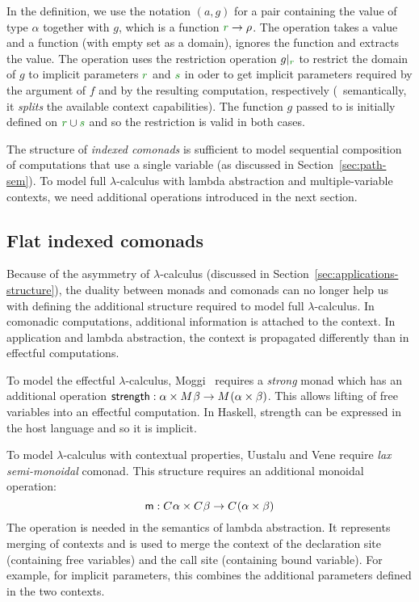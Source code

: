 \noindent
In the definition, we use the notation $(a, g)$ for a pair containing the value of type $\alpha$
together with $g$, which is a function $\cclrd{r} \rightarrow \rho$. The  operation
takes a value and a function (with empty set as a domain), ignores the function and extracts the
value. The  operation uses the restriction operation $\restr{g}{\cclrd{r}}$ to 
restrict the domain of $g$ to implicit parameters $\cclrd{r}$ and $\cclrd{s}$ in oder to get
implicit parameters required by the argument of $f$ and by the resulting computation, respectively
(\ie~semantically, it \emph{splits} the available context capabilities). The function $g$ passed 
to  is initially defined on $\cclrd{r} \cup \cclrd{s}$ and so the restriction is 
valid in both cases.

The structure of \emph{indexed comonads} is sufficient to model sequential composition of 
computations that use a single variable (as discussed in Section~\ref{sec:path-sem}). To model 
full $\lambda$-calculus with lambda abstraction and multiple-variable contexts, we need 
additional operations introduced in the next section.


\subsection{Flat indexed comonads}
\label{sec:semantics-flat-monoidal}

Because of the asymmetry of $\lambda$-calculus (discussed in Section~\ref{sec:applications-structure}),
the duality between monads and comonads can no longer help us with defining the additional structure
required to model full $\lambda$-calculus. In comonadic computations, additional information is attached
to the context. In application and lambda abstraction, the context is propagated differently than 
in effectful computations.

To model the effectful $\lambda$-calculus, Moggi~\cite{monad-notions} requires a \emph{strong} monad which
has an additional operation $\textnormal{\sffamily strength} : \alpha\times M^{}\beta \rightarrow M^{}(\alpha\times\beta)$.
This allows lifting of free variables into an effectful computation. In Haskell, strength can be expressed
in the host language and so it is implicit.

To model $\lambda$-calculus with contextual properties, Uustalu and Vene \cite{comonads-notions} 
require \emph{lax semi-monoidal} comonad. This structure requires an additional monoidal operation:
%
\begin{equation*}
\textnormal{\sffamily m} : C^{}\alpha \times C^{}\beta \rightarrow C^{}(\alpha \times \beta)
\end{equation*}
%
The  operation is needed in the semantics of lambda abstraction. It represents merging of 
contexts and is used to merge the context of the declaration site (containing free variables)
and the call site (containing bound variable). For example, for implicit parameters, this combines
the additional parameters defined in the two contexts.

